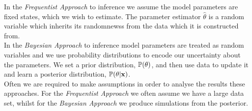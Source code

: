 \documentclass[11pt,a4paper]{article}
\begin{document}
In the \textit{Frequentist Approach} to inference we assume the model parameters are fixed states, which we wish to estimate. The parameter estimator $\hat\theta$ is a random variable which inherits its randomnewss from the data which it is constructed from.\\

In the \textit{Bayesian Approach} to inference model parameters are treated as random variables and we use probability distributions to encode our uncertainty about the parameters. We set a prior distribution, $\mathbb{P}(\theta)$, and then use data to update it and learn a posterior distribution, $\mathbb{P}(\theta|\textbf{x})$.\\

Often we are required to make assumptions in order to analyse the results these approaches. For the \textit{Frequentist Approach} we often assume we have a large data set, whilst for the \textit{Bayesian Approach} we produce simulations from the posterior.\\
\end{document}
